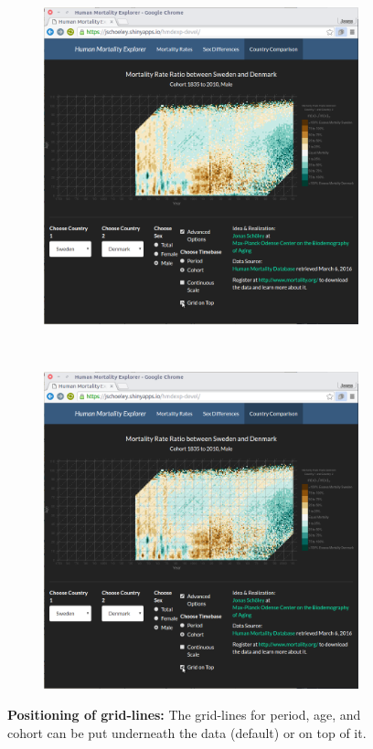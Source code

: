 \documentclass[
  12pt
]{scrartcl}
\begin{document}
\begin{figure}[!htb]
  \begin{subfigure}[t]{0.5\textwidth}
    \centering
    \includegraphics[width = \textwidth]{./fig/hmd_screen_grid_below.png}
    \label{fig:mx_grid_below}
    \end{subfigure}%
  ~
    \begin{subfigure}[t]{0.5\textwidth}
    \includegraphics[width = \textwidth]{./fig/hmd_screen_grid_above.png}
    \label{fig:mx_grid_above}
    \end{subfigure}%
    \caption*{\textbf{Positioning of grid-lines:} The grid-lines for period, age, and cohort can be put underneath the data (default) or on top of it.}
    \label{fig:mx_grid}
\end{figure}
\end{document}
